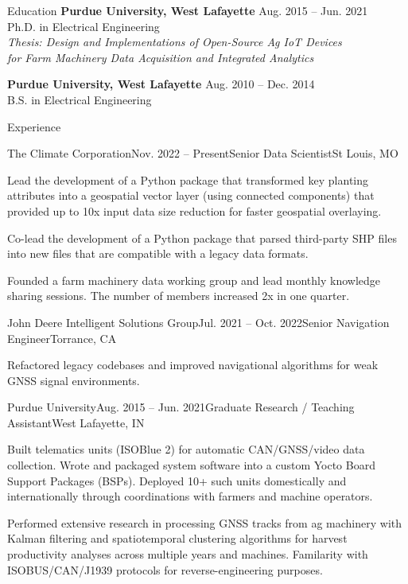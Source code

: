 \documentclass{resume}
\begin{document}
  \begin{rSection}{Education}
    {\bf Purdue University, West Lafayette} \hfill {Aug. 2015 -- Jun. 2021}
    \\ 
    {Ph.D. in Electrical Engineering} \\
    \textit{Thesis: Design and Implementations of Open-Source Ag IoT Devices \\
      for Farm Machinery Data Acquisition and Integrated Analytics}

    {\bf Purdue University, West Lafayette} \hfill {Aug. 2010 -- Dec. 2014}
    \\ 
    {B.S. in Electrical Engineering} \\
  \end{rSection}

  \begin{rSection}{Experience}
    \begin{rSubsection}{The Climate Corporation}{Nov. 2022 --
      Present}{Senior Data Scientist}{St Louis, MO}
      \item Lead the development of a Python package that transformed key
        planting attributes into a geospatial vector layer (using connected
        components) that provided up to 10x input data size reduction for
        faster geospatial overlaying.
      \item Co-lead the development of a Python package that parsed third-party
        SHP files into new files that are compatible with a legacy data formats.
      \item Founded a farm machinery data working group and lead monthly
        knowledge sharing sessions. The number of members increased 2x in one
        quarter. 
    \end{rSubsection}

    \begin{rSubsection}{John Deere Intelligent Solutions Group}{Jul. 2021 --
      Oct. 2022}{Senior Navigation Engineer}{Torrance, CA}
      \item Refactored legacy codebases and improved navigational algorithms for
      weak GNSS signal environments. 
    \end{rSubsection}

    \begin{rSubsection}{Purdue University}{Aug. 2015 -- Jun. 2021}{Graduate
        Research / Teaching Assistant}{West Lafayette, IN}
      \item Built telematics units (ISOBlue 2) for automatic CAN/GNSS/video
        data collection. Wrote and packaged system software into a custom
        Yocto Board Support Packages (BSPs). Deployed 10+ such units
        domestically and internationally through coordinations with farmers and
        machine operators.
      \item Performed extensive research in processing GNSS tracks from ag
        machinery with Kalman filtering and spatiotemporal clustering
        algorithms for harvest productivity analyses across multiple years and
        machines. Familarity with ISOBUS/CAN/J1939 protocols for
        reverse-engineering purposes. 
    \end{rSubsection}


\end{rSection}
\end{document}
